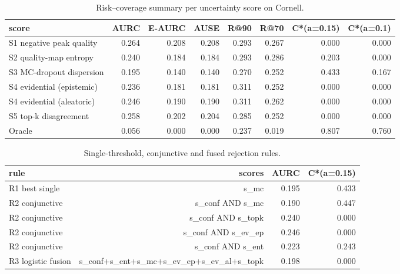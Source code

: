 \begin{table}[t]
\centering
\caption{Risk--coverage summary per uncertainty score on Cornell.}
\label{tab:scores}
\begin{tabular}{lrrrrrrr}
\toprule
score & AURC & E-AURC & AUSE & R@90 & R@70 & C*(a=0.15) & C*(a=0.1) \\
\midrule
S1 negative peak quality & 0.264 & 0.208 & 0.208 & 0.293 & 0.267 & 0.000 & 0.000 \\
S2 quality-map entropy & 0.240 & 0.184 & 0.184 & 0.293 & 0.286 & 0.203 & 0.000 \\
S3 MC-dropout dispersion & 0.195 & 0.140 & 0.140 & 0.270 & 0.252 & 0.433 & 0.167 \\
S4 evidential (epistemic) & 0.236 & 0.181 & 0.181 & 0.311 & 0.252 & 0.000 & 0.000 \\
S4 evidential (aleatoric) & 0.246 & 0.190 & 0.190 & 0.311 & 0.262 & 0.000 & 0.000 \\
S5 top-k disagreement & 0.258 & 0.202 & 0.204 & 0.285 & 0.252 & 0.000 & 0.000 \\
Oracle & 0.056 & 0.000 & 0.000 & 0.237 & 0.019 & 0.807 & 0.760 \\
\bottomrule
\end{tabular}
\end{table}

\begin{table}[t]
\centering
\caption{Single-threshold, conjunctive and fused rejection rules.}
\label{tab:rules}
\begin{tabular}{lrrr}
\toprule
rule & scores & AURC & C*(a=0.15) \\
\midrule
R1 best single & s\_mc & 0.195 & 0.433 \\
R2 conjunctive & s\_conf AND s\_mc & 0.190 & 0.447 \\
R2 conjunctive & s\_conf AND s\_topk & 0.240 & 0.000 \\
R2 conjunctive & s\_conf AND s\_ev\_ep & 0.246 & 0.000 \\
R2 conjunctive & s\_conf AND s\_ent & 0.223 & 0.243 \\
R3 logistic fusion & s\_conf+s\_ent+s\_mc+s\_ev\_ep+s\_ev\_al+s\_topk & 0.198 & 0.000 \\
\bottomrule
\end{tabular}
\end{table}

